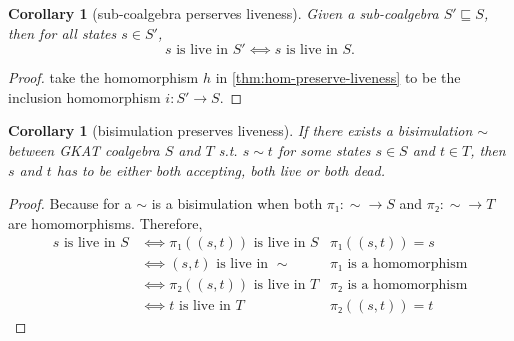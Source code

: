 \documentclass[conference]{IEEEtran}
\newtheorem{corollary}[theorem]{Corollary}
\begin{document}
\begin{corollary}[sub-coalgebra perserves liveness]\label{thm:sub-coalg-preserve-liveness}
    Given a sub-coalgebra \(S' ⊑ S\), then for all states \(s ∈ S'\),
    \[\text{\(s\) is live in \(S'\)} ⟺ \text{\(s\) is live in \(S\)}.\]
\end{corollary}

\begin{proof}
    take the homomorphism \(h\) in \cref{thm:hom-preserve-liveness} to be the inclusion homomorphism \(i: S' → S\).
\end{proof}

\begin{corollary}[bisimulation preserves liveness]\label{thm:bisim-preserve-liveness}
    If there exists a bisimulation \(∼\) between GKAT coalgebra \(S\) and \(T\) s.t. \(s ∼ t\) for some states \(s ∈ S\) and \(t ∈ T\), then \(s\) and \(t\) has to be either both accepting, both live or both dead.
\end{corollary}

\begin{proof}
    Because for a \(∼\) is a bisimulation when both \(π₁: {∼} → S\) and \(π₂: {∼} → T\) are homomorphisms.
    Therefore, 
    \begin{align*}
        s \text{ is live in } S 
        & ⟺ π₁((s, t)) \text{ is live in } S 
            & π₁((s, t)) = s\\  
        & ⟺ (s, t) \text{ is live in } {∼} 
            & \text{\(π₁\) is a homomorphism}\\  
        & ⟺ π₂((s, t)) \text{ is live in } T 
            & \text{\(π₂\) is a homomorphism} \\
        & ⟺ t \text{ is live in } T 
            & π₂((s, t)) = t
    \end{align*}
\end{proof}
\end{document}
